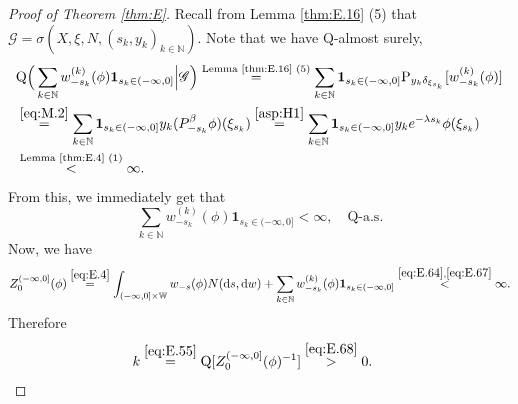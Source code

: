 \documentclass[12pt,a4paper]{amsart}
\numberwithin{equation}{section}
\theoremstyle{plain}
\theoremstyle{definition}
\theoremstyle{remark}
\begin{document}
\begin{proof}[Proof of Theorem \ref{thm:E}]
\begin{comment}
	Note that
\begin{equation} \label{eq:E.65}
\begin{minipage}{0.9\textwidth}
	if $\{Z; \mathrm P\}$ is a non-negative random variable such that there exists a $\sigma$-field $\mathscr H$ with $\mathrm P(\mathrm P[Z|\mathscr H] < \infty) = 1$, then $\mathrm P(Z < \infty) = 1$.
\end{minipage}
\end{equation}
	In fact, from
\[
	\infty \cdot \mathrm P(Z = \infty | \mathscr F)
	 = \mathrm P[Z ; Z = \infty | \mathscr F]
	 \leq \mathrm P[Z| \mathscr F] < \infty, \quad \mathrm P\text{-a.s.}
\]
	we know that
\[
	\mathrm P(Z = \infty| \mathscr F) = 0, \quad \mathrm P\text{-a.s.}
\]
	and therefore,
\[
	\mathrm P(Z = \infty) = \mathrm P[\mathrm P(Z = \infty| \mathscr F)] = 0.
\]
\end{comment}

	Recall from Lemma \ref{thm:E.16} (5) that $\mathscr G = \sigma(X, \xi, N, (s_k, y_k)_{k\in \mathbb N})$. Note that we have $\mathrm Q$-almost surely,
\begin{align}
	& \mathrm Q\Big(\sum_{k\in \mathbb N} 
	w^{(k)}_{-s_k}(\phi) \mathbf 1_{s_k \in (-\infty,0]}\Big|\mathscr G \Big)
	\overset{\text{Lemma \ref{thm:E.16} (5)}}= 
	\sum_{k\in \mathbb N} 
	\mathbf 1_{s_k \in (-\infty,0]} \mathrm P_{y_k\delta_{\xi_{s_k}}}[w^{(k)}_{-s_k}(\phi)]
	\\ &\overset{\eqref{eq:M.2}}= 
	\sum_{k\in \mathbb N} 
	\mathbf 1_{s_k \in (-\infty,0]} y_k (P_{-s_k}^\beta \phi)(\xi_{s_k})
	\overset{\eqref{asp:H1}} = 
	\sum_{k\in \mathbb N} 
	\mathbf 1_{s_k \in (-\infty,0]} y_k e^{-\lambda s_k} \phi(\xi_{s_k})
	\\ & \overset{\text{Lemma \ref{thm:E.4} (1)}} < \infty.
\end{align}
From this, we immediately get that
\begin{equation} \label{eq:E.67}
	\sum_{k\in \mathbb N} 	
	w^{(k)}_{-s_k}(\phi) \mathbf 1_{s_k \in (-\infty,0]}< \infty, \quad \mathrm Q\text{-a.s.}
\end{equation}
	Now, we have
\begin{equation} \label{eq:E.68}
	Z_0^{(-\infty, 0]}(\phi) \overset{\eqref{eq:E.4}}= \int_{(-\infty,0]\times \mathbb W}w_{-s}(\phi) N({\mathrm d}s, {\mathrm d}w) + 
	\sum_{k\in \mathbb N} 
	w^{(k)}_{-s_k}(\phi) \mathbf 1_{s_k \in (-\infty,0]}
	\overset{\eqref{eq:E.64}, \eqref{eq:E.67}} < \infty.
\end{equation}
	Therefore
\begin{align}
& k \overset{\eqref{eq:E.55}}= \mathrm Q[Z^{(-\infty,0]}_0(\phi)^{-1}] \overset{\eqref{eq:E.68}}> 0.
\end{align}


\end{proof}
\end{document}
